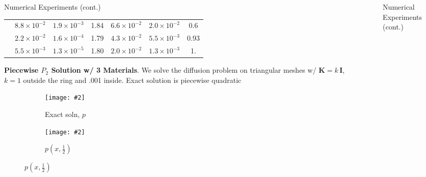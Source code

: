 \documentclass[final, svgnames]{beamer}
\newlength{\sepwid}
\newlength{\onecolwid}
\newcommand{\includegraphicsw}[2][1.]{\texttt{[image: \#2]}}
\newcommand{\vect}[1]{\boldsymbol{\mathbf{#1}}}
\begin{document}
\begin{frame}[t]
\begin{columns}[t]
\begin{column}{\onecolwid}
\begin{block}{Numerical Experiments (cont.)}
{\begin{tabular}[1.2]{| c | c || c | c | c || c | c |}
	\cline{2-7}
	& $8.8\times10^{-2}$ & $1.9\times10^{-3}$ & 1.84 & $6.6\times10^{-2}$ & $ 2.0\times10^{-2}$ & 0.6 \\
	\cline{2-7}
	& $2.2\times10^{-2}$ & $1.6\times10^{-4}$ & 1.79 & $4.3\times10^{-2}$ & $ 5.5\times10^{-3}$ & 0.93 \\
	\cline{2-7}
	& $5.5\times10^{-3}$ & $1.3\times10^{-5}$ & 1.80 & $2.0\times10^{-2}$ & $ 1.3\times10^{-3}$ & 1.   \\
	\hline
\end{tabular}}
\vskip 1cm
\textbf{Piecewise $P_2$ Solution w/ 3 Materials}. We solve the diffusion problem on triangular meshes w/ $\vect K = k\,\vect I$, $k = 1$ outside the ring and .001 inside. Exact solution is piecewise quadratic
\begin{figure}
	\centering
	\begin{subfigure}{.45\linewidth}
		\centering
		\includegraphicsw{ring_ref_mesh.png}
		\caption{Exact soln, $p$}
	\end{subfigure}%
	\hfill
	\begin{subfigure}{.45\linewidth}
		\centering
		\includegraphicsw{ring_ref_slice.png}
		\caption{$p(x,\frac{1}{2})$}
	\end{subfigure}
\end{figure}

\end{block}

\end{column} %


\begin{column}{\sepwid}\end{column} %

\begin{column}{\onecolwid} %

\begin{block}{Numerical Experiments (cont.)}


\end{block}
\end{column}
\end{columns}
\end{frame}
\end{document}
